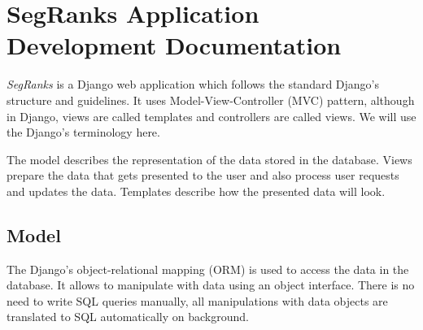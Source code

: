 \chapter{SegRanks Application Development Documentation}
\label{chapter:implementation}

\textit{SegRanks} is a Django web application which follows the standard
Django's structure and guidelines. It uses Model-View-Controller (MVC) pattern,
although in Django, views are called templates and controllers are called
views. We will use the Django's terminology here.

The model describes the representation of the data stored in the database.
Views prepare the data that gets presented to the user and also process user
requests and updates the data. Templates describe how the presented data will
look.

\section{Model}

The Django's object-relational mapping (ORM) is used to access the data in the
database. It allows to manipulate with data using an object interface. There
is no need to write SQL queries manually, all manipulations with data objects are
translated to SQL automatically on background. 

